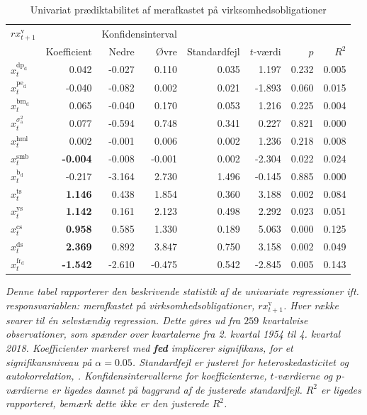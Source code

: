 \documentclass[
  a4paper,
  oneside]{memoir}
\begin{document}
\begin{table}[!h]

\caption{\label{tab:UNI-v}Univariat prædiktabilitet af merafkastet på virksomhedsobligationer}
\centering
\begin{threeparttable}
\begin{tabular}[t]{lrrrrrrr}
\toprule
\multicolumn{1}{c}{$rx_{t+1}^{\text{v}}$} & \multicolumn{1}{c}{ } & \multicolumn{2}{c}{Konfidensinterval} & \multicolumn{4}{c}{ } \\
\cmidrule(l{3pt}r{3pt}){1-1} \cmidrule(l{3pt}r{3pt}){3-4}
  & Koefficient & Nedre & Øvre & Standardfejl & $t$-værdi & $p$ & $R^2$\\
\midrule
\rowcolor{gray!6}  $x_t^{\text{dp}_{\text{d}}}$ & 0.042 & -0.027 & 0.110 & 0.035 & 1.197 & 0.232 & 0.005\\
$x_t^{\text{pe}_{\text{d}}}$ & -0.040 & -0.082 & 0.002 & 0.021 & -1.893 & 0.060 & 0.015\\
\rowcolor{gray!6}  $x_t^{\text{bm}_{\text{d}}}$ & 0.065 & -0.040 & 0.170 & 0.053 & 1.216 & 0.225 & 0.004\\
$x_t^{\sigma_{\text{a}}^2}$ & 0.077 & -0.594 & 0.748 & 0.341 & 0.227 & 0.821 & 0.000\\
\rowcolor{gray!6}  $x_t^{\text{hml}}$ & 0.002 & -0.001 & 0.006 & 0.002 & 1.236 & 0.218 & 0.008\\
$x_t^{\text{smb}}$ & \textbf{-0.004} & -0.008 & -0.001 & 0.002 & -2.304 & 0.022 & 0.024\\
\rowcolor{gray!6}  $x_t^{\text{b}_{\text{d}}}$ & -0.217 & -3.164 & 2.730 & 1.496 & -0.145 & 0.885 & 0.000\\
$x_t^{\text{ts}}$ & \textbf{ 1.146} & 0.438 & 1.854 & 0.360 & 3.188 & 0.002 & 0.084\\
\rowcolor{gray!6}  $x_t^{\text{ys}}$ & \textbf{ 1.142} & 0.161 & 2.123 & 0.498 & 2.292 & 0.023 & 0.051\\
$x_t^{\text{cs}}$ & \textbf{ 0.958} & 0.585 & 1.330 & 0.189 & 5.063 & 0.000 & 0.125\\
\rowcolor{gray!6}  $x_t^{\text{ds}}$ & \textbf{ 2.369} & 0.892 & 3.847 & 0.750 & 3.158 & 0.002 & 0.049\\
$x_t^{\text{fr}_{\text{d}}}$ & \textbf{-1.542} & -2.610 & -0.475 & 0.542 & -2.845 & 0.005 & 0.143\\
\bottomrule
\end{tabular}
\begin{tablenotes}
\item \textit{Denne tabel rapporterer den beskrivende statistik af de univariate regressioner ift. responsvariablen: merafkastet på virksomhedsobligationer, $rx_{t+1}^{\text{v}}$. Hver række svarer til én selvstændig regression. Dette gøres ud fra $259$ kvartalvise observationer, som spænder over kvartalerne fra 2. kvartal 1954 til 4. kvartal 2018. Koefficienter markeret med \textbf{fed} implicerer signifikans, for et signifikansniveau på $\alpha=0.05$. Standardfejl er justeret for heteroskedasticitet og autokorrelation, \citep{Newey1987}. Konfidensintervallerne for koefficienterne, $t$-værdierne og $p$-værdierne er ligedes dannet på baggrund af de justerede standardfejl. $R^2$ er ligedes rapporteret, bemærk dette ikke er den justerede $R^2$.}

\end{tablenotes}
\end{threeparttable}
\end{table}
\end{document}

